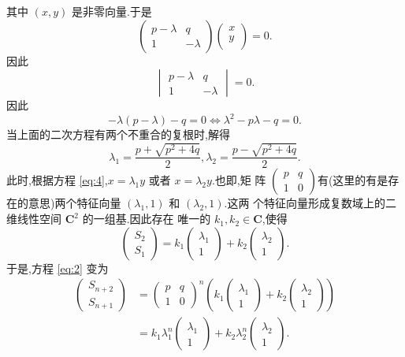 \documentclass[a4paper]{article}
\begin{document}
其中 $(x,y)$ 是非零向量.于是
\begin{equation}
  \label{eq:4}
  \begin{pmatrix}
    p-\lambda&q\\
1&-\lambda
  \end{pmatrix}\begin{pmatrix}
    x\\
y\\
  \end{pmatrix}=0.
\end{equation}
因此
\begin{equation}
  \label{eq:5}
  \begin{vmatrix}
    p-\lambda&q\\
1&-\lambda
  \end{vmatrix}=0.
\end{equation}
因此
\begin{equation}\label{eq:9.32}
-\lambda(p-\lambda)-q=0 \iff \lambda^2-p\lambda -q=0.
\end{equation}
当上面的二次方程有两个不重合的复根时,解得
$$
\lambda_1=\frac{p+\sqrt{p^2+4q}}{2},\lambda_2=\frac{p-\sqrt{p^2+4q}}{2}.
$$
此时,根据方程 \eqref{eq:4},$x=\lambda_1y$ 或者 $x=\lambda_2y$.也即,矩
阵 $\begin{pmatrix}
  p&q\\
1&0
\end{pmatrix}$有(这里的有是存在的意思)两个特征向量 $(\lambda_1,1)$ 和 $(\lambda_2,1)$.这两
个特征向量形成复数域上的二维线性空间 $\mathbf{C}^2$ 的一组基.因此存在
唯一的 $k_1,k_2\in \mathbf{C}$,使得
$$
\begin{pmatrix}
  S_2\\
S_1
\end{pmatrix}=k_1 \begin{pmatrix}
  \lambda_1\\
1
\end{pmatrix}+k_2 \begin{pmatrix}
  \lambda_2\\
1
\end{pmatrix}.
$$
于是,方程 \eqref{eq:2} 变为
\begin{align*}
  \begin{pmatrix}
    S_{n+2}\\
S_{n+1}
  \end{pmatrix}&=\begin{pmatrix}
    p&q\\
1&0
  \end{pmatrix}^{n}\left(k_1
    \begin{pmatrix}
      \lambda_1\\
1
    \end{pmatrix}+k_2
    \begin{pmatrix}
      \lambda_2\\
1
    \end{pmatrix}
\right)\\&=k_1\lambda_1^n \begin{pmatrix}
  \lambda_1\\
1
\end{pmatrix}+k_2\lambda_2^n \begin{pmatrix}
  \lambda_2\\
1
\end{pmatrix}.
\end{align*}
\end{document}
